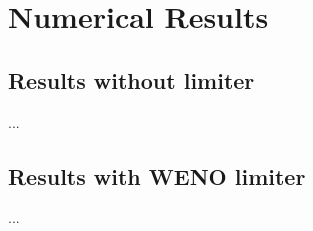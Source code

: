 \section{Numerical Results}
\subsection{Results without limiter}
\begin{frame}
	...
\end{frame}

\subsection{Results with WENO limiter}
\begin{frame}
	...
\end{frame}